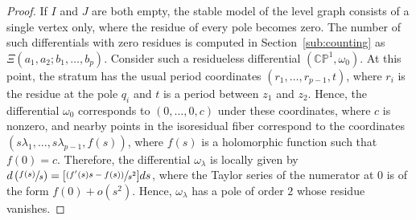 \documentclass[JEP,XML,SOM,Unicode,NoFloatCountersInSection,published]{cedram}
\newcommand{\psfrac}[2]{\sfrac{(#1)}{#2}}
\newcommand{\Bpsfrac}[2]{[\psfrac{#1}{#2}]}
\theoremstyle{definition}
\begin{document}
\begin{proof}
If $I$ and $J$ are both empty, the stable model of the level graph consists of a single vertex only, where the residue of every pole becomes zero. The number of such differentials with zero residues is computed in Section~\ref{sub:counting} as
$\Xi(a_1, a_2; b_1, \ldots, b_p)$. Consider such a residueless differential $(\mathbb{CP}^{1},\omega_{0})$. At this point, the stratum has the usual period coordinates $(r_{1},\dots,r_{p-1},t)$, where $r_{i}$ is the residue at the pole $q_{i}$ and $t$ is a period between $z_{1}$ and $z_{2}$. Hence, the differential $\omega_0$
corresponds to $(0,\dots,0,c)$ under these coordinates, where $c$ is nonzero, and nearby points in the isoresidual fiber correspond to the coordinates $(s\lambda_{1},\dots,s\lambda_{p-1}, f(s))$, where $f(s)$ is a holomorphic function such that $f(0)=c$. Therefore, the differential $\omega_{\lambda}$ is locally given by $d\left(\sfrac{f(s)}{s}\right) = \Bpsfrac{f'(s)s-f(s)}{s^{2}}ds$, where the Taylor series of the numerator at $0$ is of the form $f(0) + o(s^{2})$. Hence, $\omega_\lambda$ has a pole of order $2$ whose residue vanishes.
\end{proof}
\end{document}
